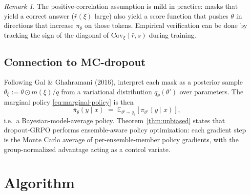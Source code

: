 \documentclass[11pt]{article}
\theoremstyle{definition}
\theoremstyle{remark}
\newtheorem{remark}[theorem]{Remark}
\newcommand{\E}{\mathbb{E}}
\newcommand{\Cov}{\mathrm{Cov}}
\begin{document}
\begin{remark}
The positive-correlation assumption is mild in practice: masks that yield a
correct answer ($\bar r(\xi)$ large) also yield a score function that pushes
$\theta$ in directions that increase $\pi_\theta$ on those tokens.  Empirical
verification can be done by tracking the sign of the diagonal of
$\Cov_\xi(\bar r, s)$ during training.
\end{remark}

\subsection{Connection to MC-dropout}

Following Gal \& Ghahramani (2016), interpret each mask as a posterior sample
$\theta_\xi := \theta\odot m(\xi)/q$ from a variational distribution
$q_\theta(\theta')$ over parameters.  The marginal policy
\eqref{eq:marginal-policy} is then
\begin{equation}
\bar\pi_\theta(y\mid x)
  \;=\;
\E_{\theta'\sim q_\theta}[\pi_{\theta'}(y\mid x)],
\end{equation}
i.e.\ a Bayesian-model-average policy.  Theorem~\ref{thm:unbiased} states
that dropout-GRPO performs ensemble-aware policy optimization: each gradient
step is the Monte Carlo average of per-ensemble-member policy gradients,
with the group-normalized advantage acting as a control variate.

\section{Algorithm}
\end{document}
